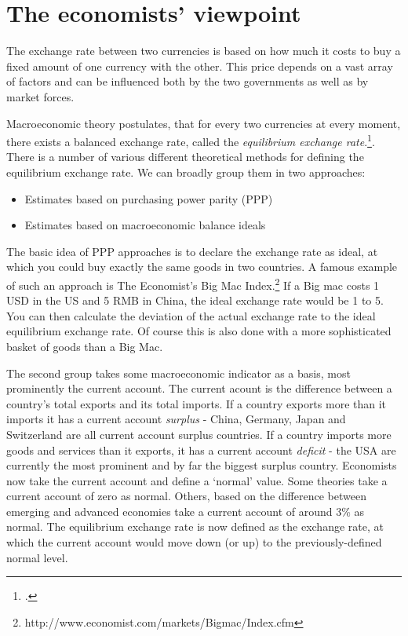 \section{The economists' viewpoint}

The exchange rate between two currencies is based on how much it 
costs to buy a fixed amount of one currency with the other. This price 
depends on a vast array of factors and can be influenced both by the two 
governments as well as by market forces.  

Macroeconomic theory postulates, that for every two currencies at every 
moment, there exists a balanced exchange rate, called the 
\emph{equilibrium exchange rate}.\footnote{\cite[pp. 505]{Krugman2008}.}. There is a number of various different theoretical methods for defining the equilibrium exchange rate. We can broadly group them in two approaches: 

\begin{itemize}
\item{Estimates based on purchasing power parity (PPP)}
\item{Estimates based on macroeconomic balance ideals}
\end{itemize}

The basic idea of PPP approaches is to declare the exchange rate as ideal, at which you could buy exactly the same goods in two countries. A famous example of such an approach is The Economist's Big Mac Index.\footnote{http://www.economist.com/markets/Bigmac/Index.cfm} If a Big mac costs 1 USD in the US and 5 RMB in China, the ideal exchange rate would be 1 to 5. You can then calculate the deviation of the actual exchange rate to the ideal equilibrium exchange rate. Of course this is also done with a more sophisticated basket of goods than a Big Mac. 

The second group takes some macroeconomic indicator as a basis, most prominently the current account. The current acount is the difference between a country's total exports and its total imports. If a country exports more than it imports it has a current account \emph{surplus} - China, Germany, Japan and Switzerland are all current account surplus countries. If a country imports more goods and services than it exports, it has a current account \emph{deficit} - the USA are currently the most prominent and by far the biggest surplus country. Economists now take the current account and define a `normal' value. Some theories take a current account of zero as normal. Others, based on the difference between emerging and advanced economies take a current account of around 3\% as normal. The equilibrium exchange rate is now defined as the exchange rate, at which the current account would move down (or up) to the previously-defined normal level.

